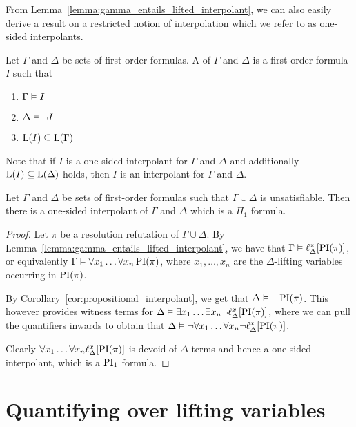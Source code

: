 From Lemma~\ref{lemma:gamma_entails_lifted_interpolant}, we can also easily derive a result on a restricted notion of interpolation which we refer to as one-sided interpolants. 

\begin{defi}
	Let $\Gamma$ and $\Delta$ be sets of first-order formulas.
	A  of $\Gamma$ and $\Delta$ is a first-order formula $I$ such that
	\begin{enumerate}
		\item $\Gamma \vDash I$
		\item $\Delta \vDash \lnot I$
		\item $\operatorname{L}(I) \subseteq \operatorname{L}(\Gamma) $
			\qedhere
	\end{enumerate}
\end{defi}

Note that if $I$ is a one-sided interpolant for $\Gamma$ and $\Delta$ and additionally $\operatorname{L}(I) \subseteq \operatorname{L}(\Delta)$ holds, then $I$ is an interpolant for $\Gamma$ and $\Delta$.

\begin{prop}
	Let $\Gamma$ and $\Delta$ be sets of first-order formulas such that $\Gamma\cup\Delta$ is unsatisfiable.
	Then there is a one-sided interpolant of $\Gamma$ and $\Delta$ which is a $\Pi_1$ formula.
\end{prop}
\begin{proof}
	Let $\pi$ be a resolution refutation of $\Gamma\cup\Delta$.
	By Lemma~\ref{lemma:gamma_entails_lifted_interpolant}, we have that
	$ \Gamma \vDash \ell_{\Delta}^{x}[\operatorname{PI}(\pi)]$,
	or equivalently
	$\Gamma \vDash \forall x_1 \dots \forall x_n  \operatorname{PI}(\pi)$, where $x_1, \dots, x_n$ are the $\Delta$-lifting variables occurring in $\operatorname{PI}(\pi)$.

	By Corollary~\ref{cor:propositional_interpolant}, we get that
	$\Delta \vDash \lnot \operatorname{PI}(\pi)$.
	This however provides witness terms for 
	$\Delta \vDash \exists x_1 \dots \exists x_n \lnot \ell_{\Delta}^{x}[ \operatorname{PI}(\pi) ]$, where we can pull the quantifiers inwards to obtain that
	$\Delta \vDash \lnot  \forall x_1 \dots \forall x_n \lnot \ell_{\Delta}^{x}[ \operatorname{PI}(\pi) ]$.

	Clearly $\forall x_1 \dots \forall x_n \ell_{\Delta}^{x}[ \operatorname{PI}(\pi) ]$ is devoid of $\Delta$-terms and hence a one-sided interpolant, which is a $\operatorname{PI}_1$ formula.
\end{proof}



\section{Quantifying over lifting variables}


